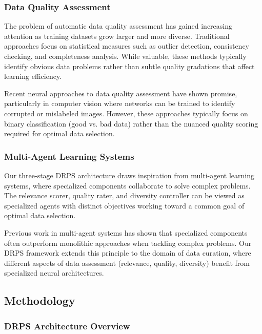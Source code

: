 \documentclass[12pt]{article}
\begin{document}
\subsubsection{Data Quality Assessment}\label{data-quality}

The problem of automatic data quality assessment has gained increasing attention as training datasets grow larger and more diverse. Traditional approaches focus on statistical measures such as outlier detection, consistency checking, and completeness analysis. While valuable, these methods typically identify obvious data problems rather than subtle quality gradations that affect learning efficiency.

Recent neural approaches to data quality assessment have shown promise, particularly in computer vision where networks can be trained to identify corrupted or mislabeled images. However, these approaches typically focus on binary classification (good vs. bad data) rather than the nuanced quality scoring required for optimal data selection.

\subsubsection{Multi-Agent Learning Systems}\label{multi-agent}

Our three-stage DRPS architecture draws inspiration from multi-agent learning systems, where specialized components collaborate to solve complex problems. The relevance scorer, quality rater, and diversity controller can be viewed as specialized agents with distinct objectives working toward a common goal of optimal data selection.

Previous work in multi-agent systems has shown that specialized components often outperform monolithic approaches when tackling complex problems. Our DRPS framework extends this principle to the domain of data curation, where different aspects of data assessment (relevance, quality, diversity) benefit from specialized neural architectures.

\subsection{Methodology}\label{methodology}

\subsubsection{DRPS Architecture Overview}\label{architecture-overview}
\end{document}

